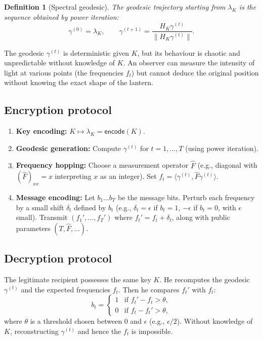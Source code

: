 \documentclass[11pt,a4paper]{article}
\newtheorem{definition}[theorem]{Definition}
\begin{document}
\begin{definition}[Spectral geodesic]
The geodesic trajectory starting from \(\lambda_K\) is the sequence obtained by power iteration:
\[
\gamma^{(0)} = \lambda_K,\qquad \gamma^{(t+1)} = \frac{H_K\gamma^{(t)}}{\|H_K\gamma^{(t)}\|}.
\]
\end{definition}

The geodesic \(\gamma^{(t)}\) is deterministic given \(K\), but its behaviour is chaotic and unpredictable without knowledge of \(K\). An observer can measure the intensity of light at various points (the frequencies \(f_t\)) but cannot deduce the original position without knowing the exact shape of the lantern.

\subsection{Encryption protocol}
\begin{enumerate}
\item \textbf{Key encoding:} \(K \mapsto \lambda_K = \mathsf{encode}(K)\).
\item \textbf{Geodesic generation:} Compute \(\gamma^{(t)}\) for \(t = 1,\ldots,T\) (using power iteration).
\item \textbf{Frequency hopping:} Choose a measurement operator \(\hat{F}\) (e.g., diagonal with \((\hat{F})_{xx} = x\) interpreting \(x\) as an integer). Set \(f_t = \langle \gamma^{(t)}, \hat{F} \gamma^{(t)} \rangle\).
\item \textbf{Message encoding:} Let \(b_1\ldots b_T\) be the message bits. Perturb each frequency by a small shift \(\delta_t\) defined by \(b_t\) (e.g., \(\delta_t = \epsilon\) if \(b_t = 1\), \(-\epsilon\) if \(b_t = 0\), with \(\epsilon\) small). Transmit \((f_1',\ldots,f_T')\) where \(f_t' = f_t + \delta_t\), along with public parameters \((T,\hat{F},\ldots)\).
\end{enumerate}

\subsection{Decryption protocol}
The legitimate recipient possesses the same key \(K\). He recomputes the geodesic \(\gamma^{(t)}\) and the expected frequencies \(f_t\). Then he compares \(f_t'\) with \(f_t\):
\[
b_t = \begin{cases}
1 & \text{if } f_t' - f_t > \theta,\\
0 & \text{if } f_t - f_t' > \theta,
\end{cases}
\]
where \(\theta\) is a threshold chosen between \(0\) and \(\epsilon\) (e.g., \(\epsilon/2\)). Without knowledge of \(K\), reconstructing \(\gamma^{(t)}\) and hence the \(f_t\) is impossible.
\end{document}
